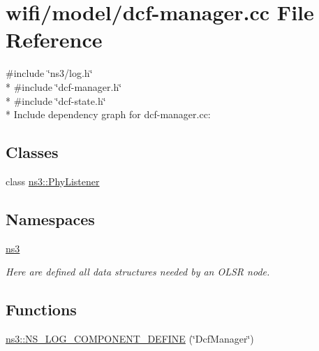 \hypertarget{dcf-manager_8cc}{}\section{wifi/model/dcf-\/manager.cc File Reference}
\label{dcf-manager_8cc}
{\ttfamily \#include \char`\"{}ns3/log.\+h\char`\"{}}\\*
{\ttfamily \#include \char`\"{}dcf-\/manager.\+h\char`\"{}}\\*
{\ttfamily \#include \char`\"{}dcf-\/state.\+h\char`\"{}}\\*
Include dependency graph for dcf-\/manager.cc\+:
\subsection*{Classes}
\begin{DoxyCompactItemize}
\item 
class \hyperlink{classns3_1_1PhyListener}{ns3\+::\+Phy\+Listener}
\end{DoxyCompactItemize}
\subsection*{Namespaces}
\begin{DoxyCompactItemize}
\item 
 \hyperlink{namespacens3}{ns3}
\begin{DoxyCompactList}\small\item\em Here are defined all data structures needed by an O\+L\+SR node. \end{DoxyCompactList}\end{DoxyCompactItemize}
\subsection*{Functions}
\begin{DoxyCompactItemize}
\item 
\hyperlink{namespacens3_aff5fb987f20a2004ea4fca2cc8014a28}{ns3\+::\+N\+S\+\_\+\+L\+O\+G\+\_\+\+C\+O\+M\+P\+O\+N\+E\+N\+T\+\_\+\+D\+E\+F\+I\+NE} (\char`\"{}Dcf\+Manager\char`\"{})
\end{DoxyCompactItemize}
